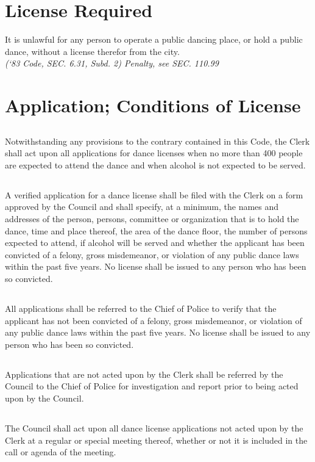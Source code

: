 \section{License Required}
It is unlawful for any person to operate a public dancing place, or hold a public dance, without a license therefor from the city.\\
\emph{(‘83 Code, SEC. 6.31, Subd. 2)  Penalty, see SEC. 110.99}
\section{Application; Conditions of License}
\subsection{}
Notwithstanding any provisions to the contrary contained in this Code, the Clerk shall act upon all applications for dance licenses when no more than 400 people are expected to attend the dance and when alcohol is not expected to be served.
\subsection{}
A verified application for a dance license shall be filed with the Clerk on a form approved by the Council and shall specify, at a minimum, the names and addresses of the person, persons, committee or organization that is to hold the dance, time and place thereof, the area of the dance floor, the number of persons expected to attend, if alcohol will be served and whether the applicant has been convicted of a felony, gross misdemeanor, or violation of any public dance laws within the past five years.  No license shall be issued to any person who has been so convicted.
\subsection{}
All applications shall be referred to the Chief of Police to verify that the applicant has not been convicted of a felony, gross misdemeanor, or violation of any public dance laws within the past five years.  No license shall be issued to any person who has been so convicted.
\subsection{}
Applications that are not acted upon by the Clerk shall be referred by the Council to the Chief of Police for investigation and report prior to being acted upon by the Council.
\subsection{}
The Council shall act upon all dance license applications not acted upon by the Clerk at a regular or special meeting thereof, whether or not it is included in the call or agenda of the meeting.
